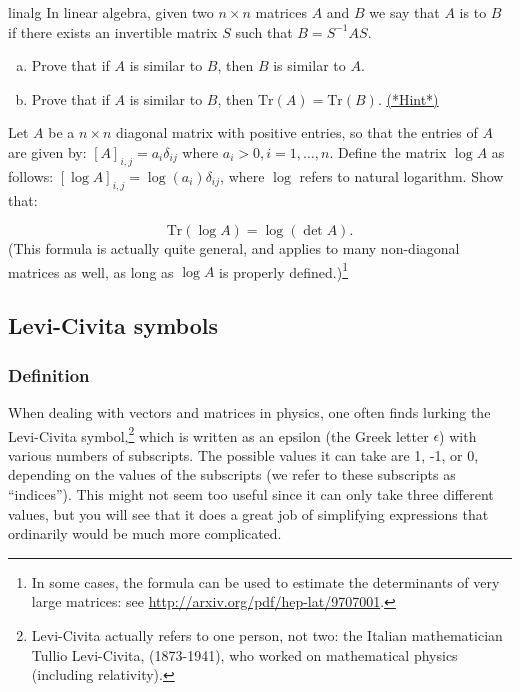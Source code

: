 \begin {exercise}{linalg}
In linear algebra, given two $n \times n$ matrices $A$ and $B$ we say that $A$ is  to $B$ if there exists an invertible matrix $S$ such that $B = S^{-1}AS$. 
\begin{enumerate}[(a)]
\item
Prove that if $A$ is similar to $B$, then $B$ is similar to $A$.
\item
Prove that if $A$ is similar to $B$, then $\text{Tr} ({A}) = \text{Tr} ({B})$. 
\hyperref[sec:sigma:hints]{(*Hint*)} 
\end{enumerate}
\end{exercise}

\begin {exercise}{}
Let $A$ be a $n \times n$ diagonal matrix with positive entries, so that the entries of $A$ are given by:  $ [A]_{i,j} = a_{i} \delta_{ij}$ where $a_i > 0, i = 1, \ldots, n$.  Define the matrix $\log A$ as follows:  $ [\log A]_{i,j} = \log(a_{i}) \delta_{ij}$, where $\log$ refers to natural logarithm.  Show that:

\[ \text{Tr}(\log A) = \log (\det A). \]
(This formula is actually quite general, and applies to many non-diagonal matrices as well, as long as $\log A$ is properly defined.)\footnote{In some cases, the formula can be used to estimate the determinants of very large matrices: see \url{http://arxiv.org/pdf/hep-lat/9707001}.} 


\end{exercise}



\subsection{Levi-Civita symbols}
\subsubsection*{Definition}
When dealing with vectors and matrices in physics, one often finds lurking  the Levi-Civita symbol,\footnote{Levi-Civita actually refers to one person, not two: the Italian mathematician Tullio Levi-Civita, (1873-1941), who worked on mathematical physics (including relativity).} which is written as an epsilon (the Greek letter $\epsilon$) with various numbers of subscripts.  The possible values it can take are 1, -1, or 0, depending on the values of the subscripts (we refer to these subscripts as ``indices'').  This might not seem too useful since it can only take three different values, but you will see that it does a great job of simplifying expressions that ordinarily would be much more complicated.  

